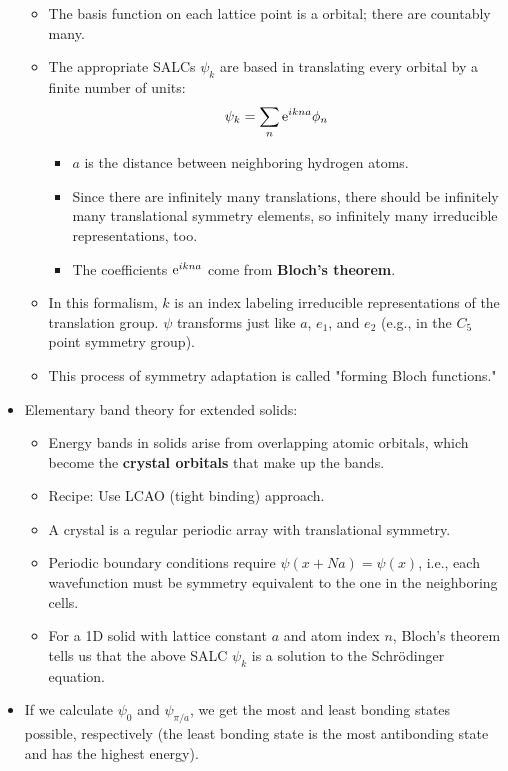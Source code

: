 \documentclass[../notes.tex]{subfiles}
\begin{document}
\begin{itemize}
    \begin{itemize}
        \item The basis function on each lattice point is a  orbital; there are countably many.
        \item The appropriate SALCs $\psi_k$ are based in translating every orbital by a finite number of units:
        \begin{equation*}
            \psi_k = \sum_n\e[ikna]\phi_n
        \end{equation*}
        \begin{itemize}
            \item $a$ is the distance between neighboring hydrogen atoms.
            \item Since there are infinitely many translations, there should be infinitely many translational symmetry elements, so infinitely many irreducible representations, too.
            \item The coefficients $\e[ikna]$ come from \textbf{Bloch's theorem}.
        \end{itemize}
        \item In this formalism, $k$ is an index labeling irreducible representations of the translation group. $\psi$ transforms just like $a$, $e_1$, and $e_2$ (e.g., in the $C_5$ point symmetry group).
        \item This process of symmetry adaptation is called "forming Bloch functions."
    \end{itemize}
    \item Elementary band theory for extended solids:
    \begin{itemize}
        \item Energy bands in solids arise from overlapping atomic orbitals, which become the \textbf{crystal orbitals} that make up the bands.
        \item Recipe: Use LCAO (tight binding) approach.
        \item A crystal is a regular periodic array with translational symmetry.
        \item Periodic boundary conditions require $\psi(x+Na)=\psi(x)$, i.e., each wavefunction must be symmetry equivalent to the one in the neighboring cells.
        \item For a 1D solid with lattice constant $a$ and atom index $n$, Bloch's theorem tells us that the above SALC $\psi_k$ is a solution to the Schr\"{o}dinger equation.
    \end{itemize}
    \item If we calculate $\psi_0$ and $\psi_{\pi/a}$, we get the most and least bonding states possible, respectively (the least bonding state is the most antibonding state and has the highest energy).

\end{itemize}
\end{document}
